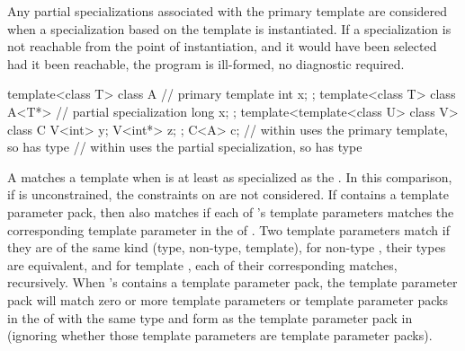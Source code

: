 \pnum
Any partial specializations associated with the
primary template are considered when a
specialization based on the template
is instantiated.
If a specialization is not reachable from the point of instantiation,
and it would have been selected had it been reachable, the program is ill-formed,
no diagnostic required.
\begin{example}
\begin{codeblock}
template<class T> class A {     // primary template
  int x;
};
template<class T> class A<T*> { // partial specialization
  long x;
};
template<template<class U> class V> class C {
  V<int>  y;
  V<int*> z;
};
C<A> c;             //  within  uses the primary template, so  has type 
                    //  within  uses the partial specialization, so  has type 
\end{codeblock}
\end{example}

\pnum
A  matches a template
  when
 is at least as specialized as the  .
In this comparison, if  is unconstrained,
the constraints on  are not considered.
If  contains a template parameter pack, then  also matches 
if each of 's template parameters
matches the corresponding template parameter in the
 of .
Two template parameters match if they are of the same kind (type, non-type, template),
for non-type , their types are
equivalent, and for template ,
each of their corresponding  matches, recursively.
When 's  contains a template parameter
pack, the template parameter pack will match zero or more template
parameters or template parameter packs in the  of
 with the same type and form as the template parameter pack in 
(ignoring whether those template parameters are template parameter packs).

